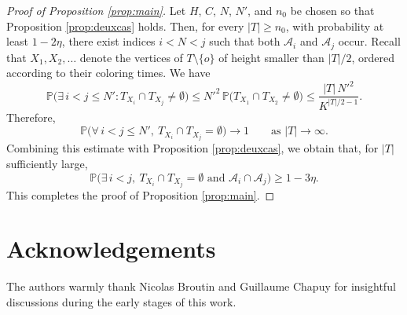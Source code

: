 \documentclass[french]{article}
\renewcommand{\P}{\mathbb{P}}
\newcommand{\Tf}{T}
\renewcommand{\1}{\mathds{1}}
\begin{document}
\begin{proof}[Proof of Proposition \ref{prop:main}]
Let $H$, $C$, $N$, $N'$, and $n_0$ be chosen so that Proposition \ref{prop:deuxcas} holds. Then, for every $|\Tf|\ge n_0$, with probability at least $1-2\eta$, there exist indices $i<N<j$ such that both $\mathcal{A}_i$ and $\mathcal{A}_j$ occur. Recall that $X_1,X_2,\ldots$ denote the vertices of $\Tf\setminus\{o\}$ of height smaller than $|\Tf|/2$, ordered according to their coloring times. We have
$$
\P\bigl(\exists\, i<j\le N' :
\Tf_{X_i}\cap\Tf_{X_j}\neq\emptyset\bigr)
\le
N'^2\,\P\bigl(\Tf_{X_1}\cap\Tf_{X_2}\neq\emptyset\bigr)
\le
\frac{|\Tf|\,N'^2}{K^{|\Tf|/2-1}}.
$$
Therefore,
\[
\P\bigl(\forall\, i<j\le N',\ \Tf_{X_i}\cap\Tf_{X_j}=\emptyset\bigr)
\longrightarrow 1
\qquad\text{as } |\Tf|\to\infty.
\]
Combining this estimate with Proposition \ref{prop:deuxcas}, we obtain that, for $|\Tf|$ sufficiently large,
\begin{equation*}
\P\bigl(\exists\, i<j,\ \Tf_{X_i}\cap\Tf_{X_j}=\emptyset
\text{ and }
\mathcal{A}_i\cap\mathcal{A}_j\bigr)
\ge 1-3\eta.
\end{equation*}
This completes the proof of Proposition \ref{prop:main}.
\end{proof}



\section*{Acknowledgements}
The authors warmly thank Nicolas Broutin and Guillaume Chapuy for insightful discussions during the early stages of this work.




\newpage
\end{document}
